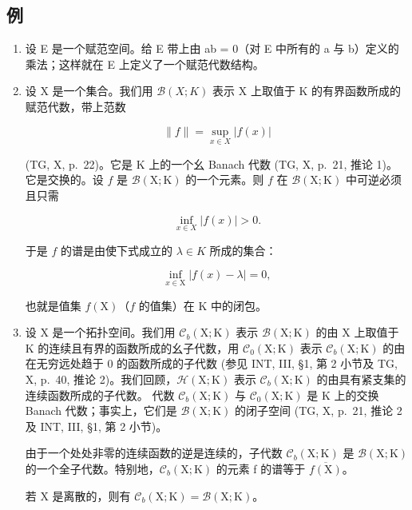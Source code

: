 \subsection{例}

\begin{enumerate}
\def\labelenumi{\arabic{enumi})}
\item
  设 E 是一个赋范空间。给 E 带上由 ab = 0（对 E 中所有的 a 与 b）定义的乘法；这样就在 E 上定义了一个赋范代数结构。
\item
  设 X 是一个集合。我们用 \(\mathcal{B}(X;K)\) 表示 X 上取值于 K 的有界函数所成的赋范代数，带上范数

\[
\| f \| = \sup _ {x \in X} | f (x) |
\]

(TG, X, p.~22)。它是 K 上的一个幺 Banach 代数 (TG, X, p.~21, 推论 1)。它是交换的。设 \(f\) 是 \(\mathcal{B}(\mathrm{X};\mathrm{K})\) 的一个元素。则 \(f\) 在 \(\mathcal{B}(\mathrm{X};\mathrm{K})\) 中可逆必须且只需

\[
\inf _ {x \in X} | f (x) | > 0.
\]

于是 \(f\) 的谱是由使下式成立的 \(\lambda\in K\) 所成的集合：

\[
\inf _ {x \in \mathrm{X}} | f (x) - \lambda | = 0,
\]

也就是值集 \(f(\mathrm{X})\)（\(f\) 的值集）在 K 中的闭包。

\item
  设 X 是一个拓扑空间。我们用 \(\mathcal{C}_{b}(\mathrm{X};\mathrm{K})\) 表示 \(\mathcal{B}(\mathrm{X};\mathrm{K})\) 的由 X 上取值于 K 的连续且有界的函数所成的幺子代数，用 \(\mathcal{C}_{0}(\mathrm{X};\mathrm{K})\) 表示 \(\mathcal{C}_{b}(\mathrm{X};\mathrm{K})\) 的由在无穷远处趋于 0 的函数所成的子代数 (参见 INT, III, §1, 第 2 小节及 TG, X, p.~40, 推论 2)。我们回顾，\(\mathcal{H}(\mathrm{X};\mathrm{K})\) 表示 \(\mathcal{C}_{b}(\mathrm{X};\mathrm{K})\) 的由具有紧支集的连续函数所成的子代数。
代数 \(\mathcal{C}_{b}(\mathrm{X};\mathrm{K})\) 与 \(\mathcal{C}_{0}(\mathrm{X};\mathrm{K})\) 是 K 上的交换 Banach 代数；事实上，它们是 \(\mathcal{B}(\mathrm{X};\mathrm{K})\) 的闭子空间 (TG, X, p.~21, 推论 2 及 INT, III, §1, 第 2 小节)。

由于一个处处非零的连续函数的逆是连续的，子代数 \(\mathcal{C}_{b}(\mathrm{X};\mathrm{K})\) 是 \(\mathcal{B}(\mathrm{X};\mathrm{K})\) 的一个全子代数。特别地，\(\mathcal{C}_{b}(\mathrm{X};\mathrm{K})\) 的元素 f 的谱等于 \(\overline{f(\mathrm{X})}\)。

若 X 是离散的，则有 \(\mathcal{C}_b(\mathrm{X};\mathrm{K}) = \mathcal{B}(\mathrm{X};\mathrm{K})\)。


\end{enumerate}
